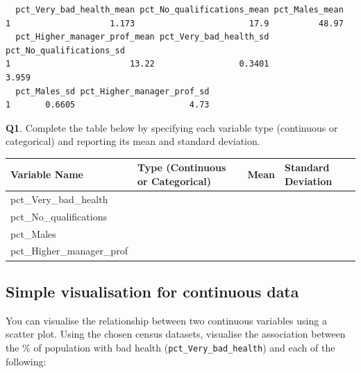 \documentclass[
  letterpaper,
  DIV=11,
  numbers=noendperiod]{scrreprt}
\newcounter{none} %
\begin{document}
\begin{verbatim}
  pct_Very_bad_health_mean pct_No_qualifications_mean pct_Males_mean
1                    1.173                       17.9          48.97
  pct_Higher_manager_prof_mean pct_Very_bad_health_sd pct_No_qualifications_sd
1                        13.22                 0.3401                    3.959
  pct_Males_sd pct_Higher_manager_prof_sd
1       0.6605                       4.73
\end{verbatim}

\textbf{Q1}. Complete the table below by specifying each variable type
(continuous or categorical) and reporting its mean and standard
deviation.

{\def\LTcaptype{none} %
\begin{longtable}[]{@{}
  >{\raggedright\arraybackslash}p{}
  >{\raggedright\arraybackslash}p{}
  >{\raggedright\arraybackslash}p{}
  >{\raggedright\arraybackslash}p{}@{}}
\toprule\noalign{}
\begin{minipage}[b]{\linewidth}\raggedright
Variable Name
\end{minipage} & \begin{minipage}[b]{\linewidth}\raggedright
Type (Continuous or Categorical)
\end{minipage} & \begin{minipage}[b]{\linewidth}\raggedright
Mean
\end{minipage} & \begin{minipage}[b]{\linewidth}\raggedright
Standard Deviation
\end{minipage} \\
\midrule\noalign{}
\endhead
\bottomrule\noalign{}
\endlastfoot
pct\_Very\_bad\_health & & & \\
pct\_No\_qualifications & & & \\
pct\_Males & & & \\
pct\_Higher\_manager\_prof & & & \\
\end{longtable}
}

\subsection{Simple visualisation for continuous
data}\label{simple-visualisation-for-continuous-data}

You can visualise the relationship between two continuous variables
using a scatter plot. Using the chosen census datasets, visualise the
association between the \% of population with bad health
(\texttt{pct\_Very\_bad\_health}) and each of the following:
\end{document}
